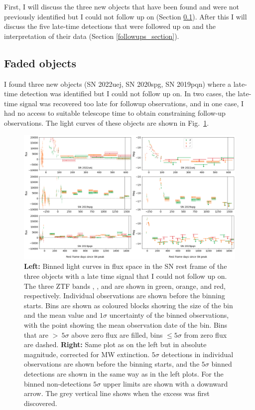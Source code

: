 \documentclass[a4paper,oneside,12pt, class=Latex/Classes/PhDthesisPSnPDF, crop=false]{standalone}
\begin{document}
First, I will discuss the three new objects that have been found and were not previously identified but I could not follow up on (Section \ref{sec:faded_objects}). After this I will discuss the five late-time detections that were followed up on and the interpretation of their data (Section \ref{followups_section}).

\subsection{Faded objects}
\label{sec:faded_objects}
I found three new objects (SN 2022uej, SN 2020spg, SN 2019pqn) where a late-time detection was identified but I could not follow up on. In two cases, the late-time signal was recovered too late for followup observations, and in one case, I had no access to suitable telescope time to obtain constraining follow-up observations. The light curves of these objects are shown in Fig.~\ref{non_followup_lcs}.\\

\begin{figure}
    \centering
    \includegraphics[width=\textwidth]{../Images/chapter_5/non_followup_lcs.png}
    \caption{\textbf{Left:} Binned light curves in flux space in the SN rest frame of the three objects with a late time signal that I could not follow up on. The three ZTF bands \ztfg, \ztfr, and \ztfi are shown in green, orange, and red, respectively. Individual observations are shown before the binning starts. Bins are shown as coloured blocks showing the size of the bin and the mean value and $1\sigma$ uncertainty of the binned observations, with the point showing the mean observation date of the bin. Bins that are $>\ 5\sigma$ above zero flux are filled, bins $\leq5\sigma$ from zero flux are dashed. \textbf{Right:} Same plot as on the left but in absolute magnitude, corrected for MW extinction. $5\sigma$ detections in individual observations are shown before the binning starts, and the $5\sigma$ binned detections are shown in the same way as in the left plots. For the binned non-detections $5\sigma$ upper limits are shown with a downward arrow. The grey vertical line shows when the excess was first discovered.}
    \label{non_followup_lcs}
\end{figure}
\end{document}
